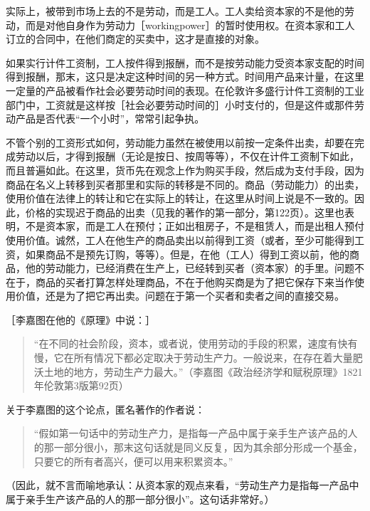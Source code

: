 实际上，被带到市场上去的不是劳动，而是工人。工人卖给资本家的不是他的劳动，而是对他自身作为劳动力［workingpower］的暂时使用权。在资本家和工人订立的合同中，在他们商定的买卖中，这才是直接的对象。

如果实行计件工资制，工人按件得到报酬，而不是按劳动能力受资本家支配的时间得到报酬，那末，这只是决定这种时间的另一种方式。时间用产品来计量，在这里一定量的产品被看作社会必要劳动时间的表现。在伦敦许多盛行计件工资制的工业部门中，工资就是这样按［社会必要劳动时间的］小时支付的，但是这件或那件劳动产品是否代表“一个小时”，常常引起争执。

不管个别的工资形式如何，劳动能力虽然在被使用以前按一定条件出卖，却要在完成劳动以后，才得到报酬（无论是按日、按周等等），不仅在计件工资制下如此，而且普遍如此。在这里，货币先在观念上作为购买手段，然后成为支付手段，因为商品在名义上转移到买者那里和实际的转移是不同的。商品（劳动能力）的出卖，使用价值在法律上的转让和它在实际上的转让，在这里从时间上说是不一致的。因此，价格的实现迟于商品的出卖（见我的著作的第一部分，第122页）。这里也表明，不是资本家，而是工人在预付；正如出租房子，不是租赁人，而是出租人预付使用价值。诚然，工人在他生产的商品卖出以前得到工资（或者，至少可能得到工资，如果商品不是预先订购，等等）。但是，在他（工人）得到工资以前，他的商品，他的劳动能力，已经消费在生产上，已经转到买者（资本家）的手里。问题不在于，商品的买者打算怎样处理商品，不在于他购买商是为了把它保存下来当作使用价值，还是为了把它再出卖。问题在于第一个买者和卖者之间的直接交易。

［李嘉图在他的《原理》中说：］

\begin{quote}{“在不同的社会阶段，资本，或者说，使用劳动的手段的积累，速度有快有慢，它在所有情况下都必定取决于劳动生产力。一般说来，在存在着大量肥沃土地的地方，劳动生产力最大。”（李嘉图《政治经济学和赋税原理》1821年伦敦第3版第92页）}\end{quote}

关于李嘉图的这个论点，匿名著作的作者说：

\begin{quote}{“假如第一句话中的劳动生产力，是指每一产品中属于亲手生产该产品的人的那一部分很小，那末这句话就是同义反复，因为其余部分形成一个基金，只要它的所有者高兴，便可以用来积累资本。”}\end{quote}

（因此，就不言而喻地承认：从资本家的观点来看，“劳动生产力是指每一产品中属于亲手生产该产品的人的那一部分很小”。这句话非常好。）

